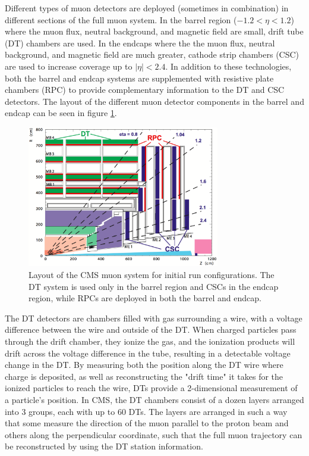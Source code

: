 Different types of muon detectors are deployed (sometimes in combination) in different sections of the full muon system. In the barrel region ($-1.2<\eta<1.2$) where the muon flux, neutral background, and magnetic field are small, drift tube (DT) chambers are used. In the endcaps where the the muon flux, neutral background, and magnetic field are much greater, cathode strip chambers (CSC) are used to increase coverage up to $|\eta|<2.4$. In addition to these technologies, both the barrel and endcap systems are supplemented with resistive plate chambers (RPC) to provide complementary information to the DT and CSC detectors. The layout of the different muon detector components in the barrel and endcap can be seen in figure \ref{fig:muonGeometry}.
 \begin{figure}
	\centering
	\includegraphics[width=0.75\textwidth]{detector/figs/muonGeometry}
	\caption{Layout of the CMS muon system for initial run configurations. The DT system is used only in the barrel region and CSCs in the endcap region, while RPCs are deployed in both the barrel and endcap.}
	\label{fig:muonGeometry}
\end{figure}

The DT detectors are chambers filled with gas surrounding a wire, with a voltage difference between the wire and outside of the DT. When charged particles pass through the drift chamber, they ionize the gas, and the ionization products will drift across the voltage difference in the tube, resulting in a detectable voltage change in the DT. By measuring both the position along the DT wire where charge is deposited, as well as reconstructing the "drift time" it takes for the ionized particles to reach the wire, DTs provide a 2-dimensional measurement of a particle's position. In CMS, the DT chambers consist of a dozen layers arranged into 3 groups, each with up to 60 DTs. The layers are arranged in such a way that some measure the direction of the muon parallel to the proton beam and others along the perpendicular coordinate, such that the full muon trajectory can be reconstructed by using the DT station information.

